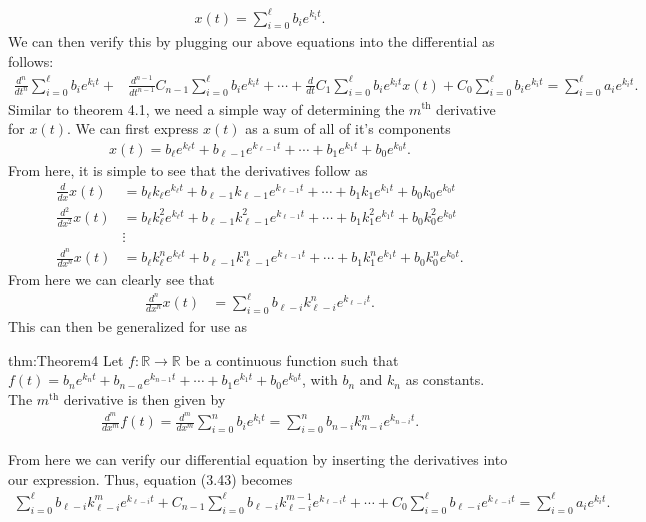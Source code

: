 \begin{align}
x(t)=\sum_{i=0}^{\ell}b_i e^{k_i t}.
\end{align}
We can then verify this by plugging our above equations into the differential as follows:
\begin{align}
\frac{d^n}{dt^n}\sum_{i=0}^{\ell}b_i e^{k_i t}+&\frac{d^{n-1}}{dt^{n-1}}C_{n-1}\sum_{i=0}^{\ell}b_i e^{k_i t}+\cdots+\frac{d}{dt}C_1\sum_{i=0}^{\ell}b_i e^{k_i t}x(t)+C_0\sum_{i=0}^{\ell}b_i e^{k_i t}=\sum_{i=0}^{\ell}a_i e^{k_i t}.
\end{align}
Similar to theorem 4.1, we need a simple way of determining the $m^\textrm{th}$ derivative for $x(t)$. We can first express $x(t)$ as a sum of all of it's components
\begin{align}
x(t)=b_\ell e^{k_\ell t}+b_{\ell-1}e^{k_{\ell-1}t}+\cdots+b_1e^{k_1t}+b_0e^{k_0t}.
\end{align}
From here, it is simple to see that the derivatives follow as
\begin{align}
\frac{d}{dx}x(t)&=b_\ell k_\ell e^{k_\ell t}+b_{\ell-1}k_{\ell-1}e^{k_{\ell-1}t}+\cdots+b_1k_1e^{k_1t}+b_0k_0e^{k_0t} \\
\frac{d^2}{dx^2}x(t)&=b_\ell k_\ell^2 e^{k_\ell t}+b_{\ell-1}k_{\ell-1}^2e^{k_{\ell-1}t}+\cdots+b_1k_1^2e^{k_1t}+b_0k_0^2e^{k_0t} \\
&\vdots \\
\frac{d^n}{dx^n}x(t)&=b_\ell k_\ell^n e^{k_\ell t}+b_{\ell-1}k_{\ell-1}^ne^{k_{\ell-1}t}+\cdots+b_1k_1^ne^{k_1t}+b_0k_0^ne^{k_0t}. 
\end{align}
From here we can clearly see that
\begin{align}
\frac{d^n}{dx^n}x(t)&=\sum_{i=0}^{\ell}b_{\ell-i} k_{\ell-i}^n e^{k_{\ell-i} t}.
\end{align}
This can then be generalized for use as
\begin{theo}{thm:Theorem4}
	Let $f:\mathbb{R}\rightarrow\mathbb{R}$ be a continuous function such that $f(t)=b_n e^{k_n t}+b_{n-a}e^{k_{n-1}t}+\cdots+b_1e^{k_1t}+b_0e^{k_0t}$, with $b_n$ and $k_n$ as constants. The $m^\textrm{th}$ derivative is then given by
	\begin{align*}
	\frac{d^m}{dx^m}f(t)=\frac{d^m}{dx^m}\sum_{i=0}^{n}b_ie^{k_it}=\sum_{i=0}^{n}b_{n-i} k_{n-i}^m e^{k_{n-i} t}.
	\end{align*}
\end{theo}
From here we can verify our differential equation by inserting the derivatives into our expression. Thus, equation (3.43) becomes 
\begin{align}
\sum_{i=0}^{\ell}b_{\ell-i} k_{\ell-i}^m e^{k_{\ell-i} t}+C_{n-1}\sum_{i=0}^{\ell}b_{\ell-i} k_{\ell-i}^{m-1} e^{k_{\ell-i} t}+\cdots+C_0\sum_{i=0}^{\ell}b_{\ell-i} e^{k_{\ell-i} t}=\sum_{i=0}^{\ell}a_i e^{k_i t}.
\end{align}
